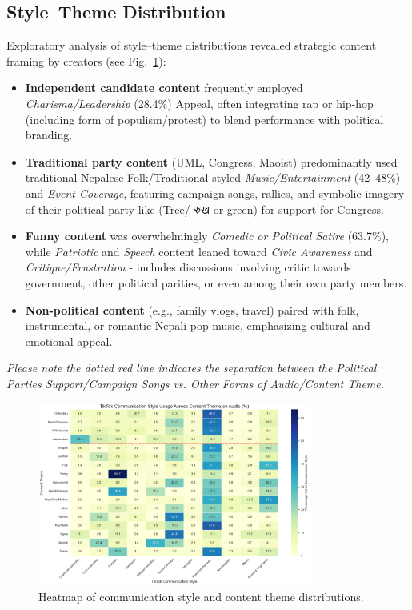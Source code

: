 \documentclass[12pt,a4paper]{report}
\begin{document}
\subsection{Style--Theme Distribution}
Exploratory analysis of style--theme distributions revealed strategic content framing by creators (see Fig.~\ref{fig:TikTokComm}):
\begin{itemize}[noitemsep]
    \item \textbf{Independent candidate content} frequently employed \emph{Charisma/Leadership} (28.4\%) Appeal, often integrating rap or hip-hop (including  form of populism/protest) to blend performance with political branding.
    \item \textbf{Traditional party content} (UML, Congress, Maoist) predominantly used traditional Nepalese-Folk/Traditional styled \emph{Music/Entertainment} (42--48\%) and \emph{Event Coverage}, featuring campaign songs, rallies, and symbolic imagery of their political party like (Tree/ \texthindi{रुख} or green) for support for Congress.
    \item \textbf{Funny content} was overwhelmingly \emph{Comedic or Political Satire} (63.7\%), while \emph{Patriotic} and \emph{Speech} content leaned toward \emph{Civic Awareness} and \emph{Critique/Frustration} - includes discussions involving critic towards government, other political parities, or even among their own party members.
    \item \textbf{Non-political content} (e.g., family vlogs, travel) paired with folk, instrumental, or romantic Nepali pop music, emphasizing cultural and emotional appeal.
\end{itemize}
\textit{Please note the dotted red line indicates the separation between the Political Parties Support/Campaign Songs vs. Other Forms of Audio/Content Theme. }
\begin{figure}[ht]
\centering
\includegraphics[width=0.8\textwidth]{figures/RQ2/TikTok_Comm_Heatmap.png}
\caption{Heatmap of communication style and content theme distributions.}
\label{fig:TikTokComm}
\end{figure}
\end{document}
